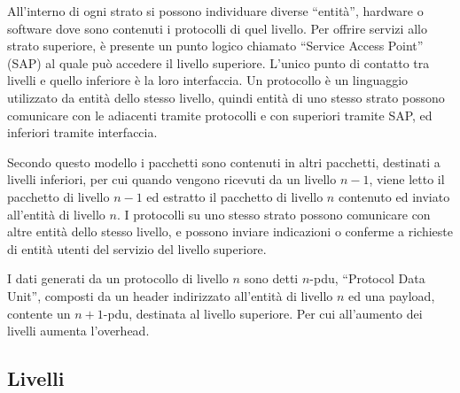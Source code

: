 \documentclass{article}
\numberwithin{equation}{subsection}
\begin{document}
All'interno di ogni strato si possono individuare diverse ``entità'', hardware o software dove sono contenuti i protocolli di quel livello. Per offrire servizi allo 
strato superiore, è presente un punto logico chiamato ``Service Access Point'' (SAP) al quale può accedere il livello superiore. 
L'unico punto di contatto tra livelli e quello inferiore è la loro interfaccia. Un protocollo è un linguaggio utilizzato da entità dello stesso livello, quindi entità 
di uno stesso strato possono comunicare con le adiacenti tramite protocolli e con superiori tramite SAP, ed inferiori tramite interfaccia. 

Secondo questo modello i pacchetti sono contenuti in altri pacchetti, destinati a livelli inferiori, per cui quando vengono ricevuti da un livello $n-1$, viene letto 
il pacchetto di livello $n-1$ ed estratto il pacchetto di livello $n$ contenuto ed inviato all'entità di livello $n$. 
I protocolli su uno stesso strato possono comunicare con altre entità dello stesso livello, e possono inviare indicazioni o conferme a richieste di entità utenti del 
servizio del livello superiore. 

I dati generati da un protocollo di livello $n$ sono detti $n$-pdu, ``Protocol Data Unit'', composti da un header indirizzato all'entità di livello $n$ ed una payload, 
contente un $n+1$-pdu, destinata al livello superiore. Per cui all'aumento dei livelli aumenta l'overhead. 

\subsection{Livelli}
\end{document}
